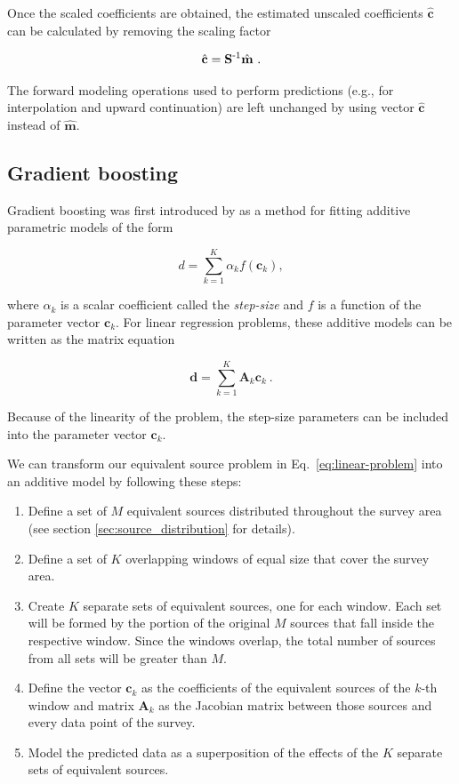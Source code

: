 Once the scaled coefficients are obtained, the estimated unscaled coefficients
$\hat{\mathbf{c}}$ can be calculated by removing the scaling factor

\begin{equation}
    \hat{\mathbf{c}} = \mathbf{S}^{\text{-}1} \hat{\mathbf{m}} \ .
\end{equation}

\noindent The forward modeling operations used to perform predictions
(e.g., for interpolation and upward continuation) are left unchanged by
using vector $\hat{\mathbf{c}}$ instead of $\hat{\mathbf{m}}$.


\subsection{Gradient boosting}

Gradient boosting was first introduced by \citet{friedman2001, friedman2002} as
a method for fitting additive parametric models of the form

\begin{equation}
    d = \sum_{k=1}^K \alpha_k f(\mathbf{c}_k),
\end{equation}

\noindent where $\alpha_k$ is a scalar coefficient called the \emph{step-size}
and $f$ is a function of the parameter vector $\mathbf{c}_k$.
For linear regression problems, these additive models can be written as the
matrix equation

\begin{equation}
    \mathbf{d} = \sum_{k=1}^K \mathbf{A}_k \mathbf{c}_k \ .
    \label{eq:gb-linear-model}
\end{equation}

\noindent Because of the linearity of the problem, the step-size parameters
can be included into the parameter vector $\mathbf{c}_k$.

We can transform our equivalent source problem in
Eq.~\ref{eq:linear-problem} into an additive model by following these
steps:

\begin{enumerate}
  \item Define a set of $M$ equivalent sources distributed throughout the
    survey area (see section \ref{sec:source_distribution} for details).
  \item Define a set of $K$ overlapping windows of equal size that cover the
    survey area.
  \item Create $K$ separate sets of equivalent sources, one for each window.
    Each set will be formed by the portion of the original $M$ sources that
    fall inside the respective window.
    Since the windows overlap, the total number of sources from all sets will
    be greater than $M$.
  \item Define the vector $\mathbf{c}_k$ as the coefficients of the equivalent
    sources of the $k$-th window and matrix $\mathbf{A}_k$ as the Jacobian
    matrix between those sources and every data point of the survey.
  \item Model the predicted data as a superposition of the effects of the $K$
    separate sets of equivalent sources.
\end{enumerate}


